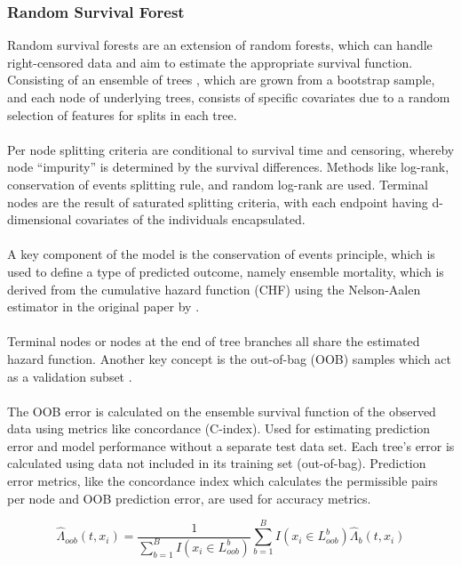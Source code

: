 \subsubsection{Random Survival Forest}
\noindent Random survival forests \parencite{ishwaran_random_2008} are an extension of random forests, which can handle right-censored data and aim to estimate the appropriate survival function. Consisting of an ensemble of trees \parencite{ishwaran_random_2008}, which are grown from a bootstrap sample, and each node of underlying trees, consists of specific covariates due to a random selection of features for splits in each tree.
\\\\
\noindent Per node splitting criteria are conditional to survival time and censoring, whereby node “impurity” \parencite{ishwaran_random_2008} is determined by the survival differences. Methods like log-rank, conservation of events splitting rule, and random log-rank are used. Terminal nodes are the result of saturated splitting criteria, with each endpoint having d-dimensional covariates of the individuals encapsulated. 
\\\\
\noindent A key component of the model is the conservation of events principle, which is used to define a type of predicted outcome, namely ensemble mortality, which is derived from the cumulative hazard function (CHF) using the Nelson-Aalen estimator in the original paper by \parencite{ishwaran_random_2008}. 
\\\\
\noindent Terminal nodes or nodes at the end of tree branches all share the estimated hazard function. Another key concept is the out-of-bag (OOB) samples which act as a validation subset \parencite{ishwaran_random_2008}. 
\\\\
\noindent The OOB error is calculated on the ensemble survival function of the observed data using metrics like concordance (C-index). Used for estimating prediction error and model performance without a separate test data set. Each tree's error is calculated using data not included in its training set (out-of-bag). Prediction error metrics, like the concordance index which calculates the permissible pairs per node and OOB prediction error, are used for accuracy metrics. 

\begin{equation} \label{eq:ooberror}
\hat{\Lambda}_{oob}(t,x_{i}) = \frac{1}{\sum_{b=1}^{B}I(x_{i}\in L^{b}_{oob})}\sum_{b=1}^{B}I(x_{i}\in L^{b}_{oob})\hat{\Lambda}_{b}(t,x_{i})
\end{equation}


